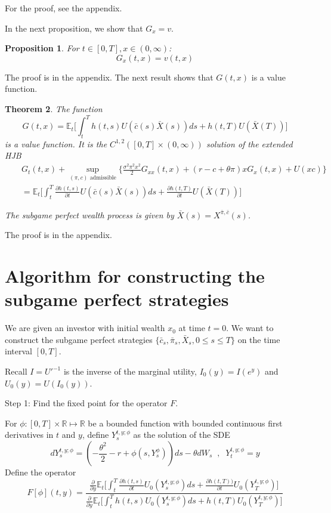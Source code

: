 \documentclass[11pt, psfig]{article}
\newtheorem{theorem}{Theorem}[section]
\newtheorem{proposition}[theorem]{Proposition}
\theoremstyle{definition}
\theoremstyle{remark}
\numberwithin{equation}{section}
\def\sR{\mathbb{R}}
\def\sR{\mathbb{R}}
\def\sE{\mathbb{E}}
\newcommand{\be}{\begin{equation}}
\newcommand{\ee}{\end{equation}}
\begin{document}
For the proof, see the appendix.

In the next proposition, we show that $G_x=v$.
 
\begin{proposition}\label{Gx_equals_v}
For $t\in [0,T], x\in (0,\infty)$:
\be
G_x(t,x)=v(t,x)
\ee
\end{proposition}
The proof is in the appendix. The next result shows that $G(t,x)$ is a value function.

\begin{theorem}\label{subgame}
The function
$$G(t,x)=\sE_{t}\bigg[\int_{t}^{T} h(t,s)U(\bar{c}(s)\bar{X}(s))ds+ h(t,T)U(\bar{X}(T))\bigg]$$ is a value function.
It is the $C^{1,2}([0,T]\times (0,\infty))$ solution of the extended HJB
\begin{eqnarray}\label{extended_PDE_G}
&&G_t(t,x)+\sup_{(\pi, c) \textrm{ admissible}} \{  \frac{\sigma^2\pi^2 x^2}{2}G_{xx}(t,x)+(r-c+\theta\pi)xG_{x}(t,x)+U(x c)\} \nonumber \\
&&=\sE_{t}\bigg[\int_{t}^{T}\frac{\partial h(t,s)}{\partial t}U(\bar{c}(s)\bar{X}(s))ds+\frac{\partial h(t,T)}{\partial t}U(\bar{X}(T))\bigg] 
\end{eqnarray}

The subgame perfect wealth process is given by
$\bar{X}(s)=X^{\bar{\pi}, \bar{c}}(s)$.
\end{theorem}
The proof is in the appendix.


\section{ Algorithm for constructing the subgame perfect strategies}

We are given an investor with initial wealth $x_0$ at time $t=0$. We want to construct the subgame perfect strategies $\{\bar{c}_s, \bar{\pi}_s, \bar{X}_s, 0\leq s\leq T\}$ on the time interval $[0,T]$.

Recall $I=U'^{-1}$ is the inverse of the marginal utility, $I_0(y)=I(e^y)$ and $U_0(y)=U(I_0(y))$.

Step 1: Find the fixed point for the operator $F$.

For $\phi:[0,T]\times \sR \mapsto \sR $ be a bounded function with bounded continuous first derivatives in $t$ and $y$, define
 $Y_s^{t,y ;\phi}$ as the solution of the SDE
 \begin{equation*}
dY_{s}^{t, y; \phi}=(-\frac{\theta^2}{2}-r+\phi(s,Y_{s}^{\phi}))ds-\theta dW_{s} \;\; , \;\;  Y_t^{t,y ;\phi}=y 
\end{equation*}
Define the operator
 \begin{equation*}
F[\phi](t,y)= \frac{\frac{\partial }{\partial y} \sE_{t}\bigg[\int_{t}^{T}\frac{\partial h(t,s)}{\partial t}U_0(Y_s^{t,y; \phi})ds+\frac{\partial h(t,T))}{\partial t}U_0(Y_T^{t, y;\phi})\bigg]}{\frac{\partial }{\partial y} \sE_{t}\bigg[\int_{t}^{T}h(t,s)U_0(Y_s^{t,y;\phi})ds+h(t,T)U_0(Y_T^{t,y;\phi})\bigg]}
 \end{equation*}
\end{document}
